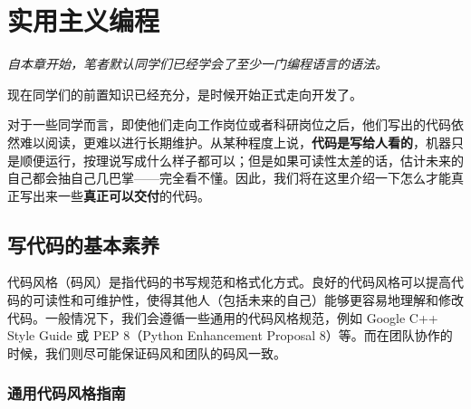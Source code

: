 \documentclass[../main.tex]{subfiles}
\begin{document}
\chapter{实用主义编程}

\begin{flushright}
    \emph{自本章开始，笔者默认同学们已经学会了至少一门编程语言的语法。}
\end{flushright}

现在同学们的前置知识已经充分，是时候开始正式走向开发了。

对于一些同学而言，即使他们走向工作岗位或者科研岗位之后，他们写出的代码依然难以阅读，更难以进行长期维护。从某种程度上说，\textbf{代码是写给人看的}，机器只是顺便运行，按理说写成什么样子都可以；但是如果可读性太差的话，估计未来的自己都会抽自己几巴掌——完全看不懂。因此，我们将在这里介绍一下怎么才能真正写出来一些\textbf{真正可以交付}的代码。

\section{写代码的基本素养}\label{sec:code-style}

代码风格（码风）是指代码的书写规范和格式化方式。良好的代码风格可以提高代码的可读性和可维护性，使得其他人（包括未来的自己）能够更容易地理解和修改代码。一般情况下，我们会遵循一些通用的代码风格规范，例如 Google C++ Style Guide 或 PEP 8（Python Enhancement Proposal 8）等。而在团队协作的时候，我们则尽可能保证码风和团队的码风一致。

\subsection{通用代码风格指南}
\end{document}
